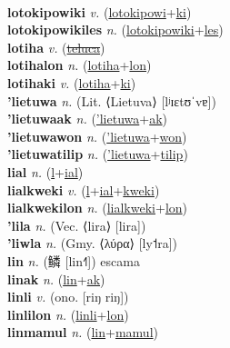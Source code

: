  \label{lotokipowinyolyan} \\
\textbf{lotokipowiki} \textit{v.} (\hyperref[lotokipowi]{lotokipowi}+\hyperref[ki]{ki})
 \label{lotokipowiki} \\
\textbf{lotokipowikiles} \textit{n.} (\hyperref[lotokipowiki]{lotokipowiki}+\hyperref[les]{les})
 \label{lotokipowikiles} \\
\textbf{lotiha} \textit{v.} (\hyperref[teluca]{\sout{teluca}})
 \label{lotiha} \\
\textbf{lotihalon} \textit{n.} (\hyperref[lotiha]{lotiha}+\hyperref[lon]{lon})
 \label{lotihalon} \\
\textbf{lotihaki} \textit{v.} (\hyperref[lotiha]{lotiha}+\hyperref[ki]{ki})
 \label{lotihaki} \\
\textbf{'lietuwa} \textit{n.} (Lit. ⟨Lietuva⟩ [lʲɪɛtʊˈvɐ])
 \label{'lietuwa} \\
\textbf{'lietuwaak} \textit{n.} (\hyperref['lietuwa]{'lietuwa}+\hyperref[ak]{ak})
 \label{'lietuwaak} \\
\textbf{'lietuwawon} \textit{n.} (\hyperref['lietuwa]{'lietuwa}+\hyperref[won]{won})
 \label{'lietuwawon} \\
\textbf{'lietuwatilip} \textit{n.} (\hyperref['lietuwa]{'lietuwa}+\hyperref[tilip]{tilip})
 \label{'lietuwatilip} \\
\textbf{lial} \textit{n.} (\hyperref[l]{l}+\hyperref[ial]{ial})
 \label{lial} \\
\textbf{lialkweki} \textit{v.} (\hyperref[l]{l}+\hyperref[ial]{ial}+\hyperref[kweki]{kweki})
 \label{lialkweki} \\
\textbf{lialkwekilon} \textit{n.} (\hyperref[lialkweki]{lialkweki}+\hyperref[lon]{lon})
 \label{lialkwekilon} \\
\textbf{'lila} \textit{n.} (Vec. ⟨lira⟩ [lira])
 \label{'lila} \\
\textbf{'liwla} \textit{n.} (Gmy. ⟨λύρα⟩ [ly˦ra])
 \label{'liwla} \\
\textbf{lin} \textit{n.} ({\chinese{}鳞} [lin˧˥])
escama \label{lin} \\
\textbf{linak} \textit{n.} (\hyperref[lin]{lin}+\hyperref[ak]{ak})
 \label{linak} \\
\textbf{linli} \textit{v.} (ono. [riŋ riŋ])
 \label{linli} \\
\textbf{linlilon} \textit{n.} (\hyperref[linli]{linli}+\hyperref[lon]{lon})
 \label{linlilon} \\
\textbf{linmamul} \textit{n.} (\hyperref[lin]{lin}+\hyperref[mamul]{mamul})
 \label{linmamul} \\
